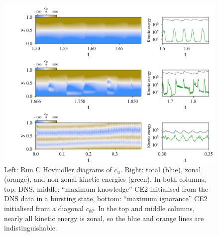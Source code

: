 \documentclass{jfm}
\newcommand{\cu}{c_u}
\newcommand{\ctt}{c_{\theta \theta}}
\begin{document}
\begin{figure}
  \centering
  \includegraphics[width=\textwidth]{run_C_fig.pdf}
  \caption{ Left: Run C Hovm\"oller diagrams of $\cu$. Right: total (blue), zonal (orange), and non-zonal kinetic energies (green). In both columns, top: DNS, middle: ``maximum knowledge'' CE2 initialised from the DNS data in a bursting state, bottom: ``maximum ignorance'' CE2 initialised from a diagonal $\ctt$. In the top and middle columns, nearly all kinetic energy is zonal, so the blue and orange lines are indistinguishable.}
  \label{fig:run_C}
\end{figure}
\end{document}
